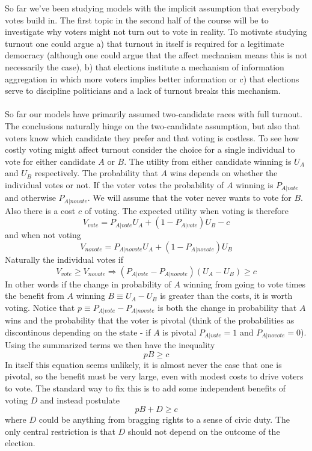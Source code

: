 So far we've been studying models with the implicit assumption that everybody votes build in. The first topic in the second half of the course will be to investigate why voters might not turn out to vote in reality. To motivate studying turnout one could argue a) that turnout in itself is required for a legitimate democracy (although one could argue that the affect mechanism means this is not necessarily the case), b) that elections institute a mechanism of information aggregation in which more voters implies better information or c) that elections serve to discipline politicians and a lack of turnout breaks this mechanism.
\\ \\
So far our models have primarily assumed two-candidate races with full turnout. The conclusions naturally hinge on the two-candidate assumption, but also that voters know which candidate they prefer and that voting is costless. To see how costly voting might affect turnout consider the choice for a single individual to vote for either candidate $A$ or $B$. The utility from either candidate winning is $U_A$ and $U_B$ respectively. The probability that $A$ wins depends on whether the individual votes or not. If the voter votes the probability of $A$ winning is $P_{A|vote}$  and otherwise $P_{A|novote}$. We will assume that the voter never wants to vote for $B$. Also there is a cost $c$ of voting. The expected utility when voting is therefore 
\begin{equation}
    V_{vote} = P_{A|vote}U_A + (1-P_{A|vote})U_B - c 
\end{equation}
and when not voting 
\begin{equation}
    V_{novote} = P_{A|novote}U_A + (1-P_{A|novote})U_B      
\end{equation}
Naturally the individual votes if 
\begin{equation}
    V_{vote} \geq V_{novote} \Rightarrow (P_{A|vote}- P_{A|novote}) (U_A- U_B) \geq c
\end{equation}
In other words if the change in probability of $A$ winning from going to vote times the benefit from $A$ winning $B \equiv U_A - U_B$ is greater than the costs, it is worth voting. Notice that $p\equiv P_{A|vote}- P_{A|novote}$ is both the change in probability that $A$ wins and the probability that the voter is pivotal (think of the probabilities as discontinous depending on the state - if $A$ is pivotal $P_{A|vote}=1$ and $P_{A|novote}=0$). Using the summarized terms we then have the inequality
\begin{equation}
    pB \geq c
\end{equation}
In itself this equation seems unlikely, it is almost never the case that one is pivotal, so the benefit must be very large, even with modest costs to drive voters to vote. The standard way to fix this is to add some independent benefits of voting $D$ and instead postulate 
\begin{equation}
    pB + D \geq c
\end{equation}
where $D$ could be anything from bragging rights to a sense of civic duty. The only central restriction is that $D$ should not depend on the outcome of the election. 

